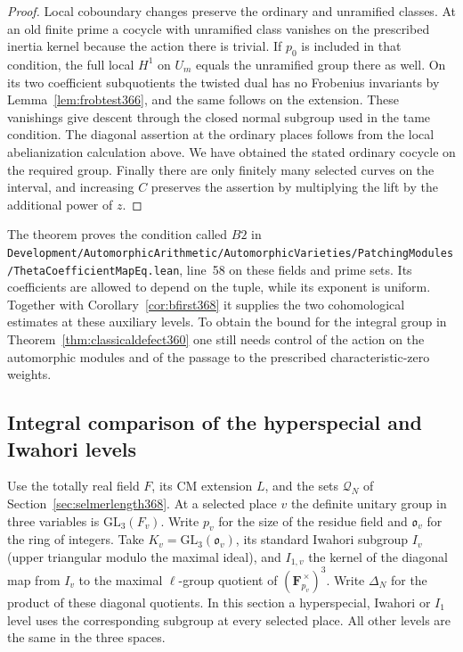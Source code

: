 \documentclass[a4paper,11pt]{article}
\theoremstyle{definition}
\theoremstyle{remark}
\newcommand{\srcloc}[2]{{\small\nolinkurl{#1.lean}}, line~#2}
\numberwithin{equation}{section}
\begin{document}
\begin{proof}
Local coboundary changes preserve the ordinary and unramified
classes. At an old finite prime a cocycle with unramified
class vanishes on the prescribed inertia kernel because the
action there is trivial. If \(p_0\) is included in that
condition, the full local \(H^1\) on \(U_m\) equals the
unramified group there as well. On its two coefficient
subquotients the twisted dual has no Frobenius invariants
by Lemma~\ref{lem:frobtest366}, and the same follows on
the extension. These vanishings give descent through the
closed normal subgroup used in the tame condition. The
diagonal assertion at the ordinary places follows from the
local abelianization calculation above. We have obtained
the stated ordinary cocycle on the required group. Finally
there are only finitely many selected curves on the interval,
and increasing \(C\) preserves the assertion by multiplying
the lift by the additional power of \(z\).
\end{proof}

The theorem proves the condition called \(B2\) in
\srcloc{Development/AutomorphicArithmetic/AutomorphicVarieties/PatchingModules/ThetaCoefficientMapEq}{58}
on these fields and prime sets. Its coefficients are allowed
to depend on the tuple, while its exponent is uniform.
Together with Corollary~\ref{cor:bfirst368} it supplies the
two cohomological estimates at these auxiliary levels. To
obtain the bound for the integral group in
Theorem~\ref{thm:classicaldefect360} one still needs control
of the action on the automorphic modules and of the passage
to the prescribed characteristic-zero weights.


\subsection{Integral comparison of the hyperspecial and Iwahori levels}
\label{sec:levelmaps370}

Use the totally real field \(F\), its CM extension \(L\), and
the sets \(\mathcal Q_N\) of Section~\ref{sec:selmerlength368}.
At a selected place \(v\) the definite unitary group in three
variables is \(\mathrm{GL}_3(F_v)\). Write \(p_v\) for the size of
the residue field and \(\mathfrak o_v\) for the ring of integers.
Take \(K_v=\mathrm{GL}_3(\mathfrak o_v)\), its standard Iwahori
subgroup \(I_v\) (upper triangular modulo the maximal ideal),
and \(I_{1,v}\) the kernel of the diagonal map from \(I_v\) to
the maximal \(\ell\)-group quotient of
\((\mathbf F_{p_v}^{\,\times})^3\). Write \(\Delta_N\) for the
product of these diagonal quotients. In this section a
hyperspecial, Iwahori or \(I_1\) level uses the corresponding
subgroup at every selected place. All other levels are the
same in the three spaces.
\end{document}
